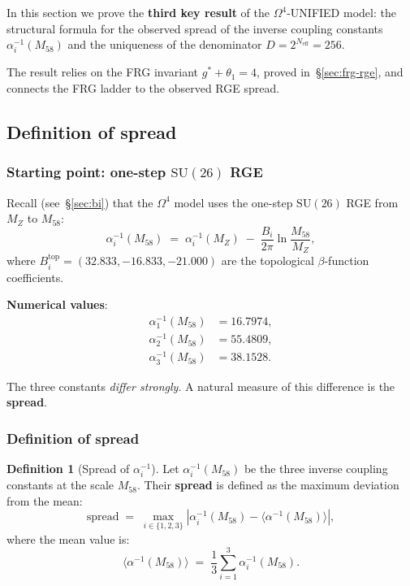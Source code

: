 \documentclass[11pt,a4paper]{article}
\newcommand{\SU}{\ensuremath{\mathrm{SU}}}
\newcommand{\Om}{\ensuremath{\Omega^4}}
\theoremstyle{definition}
\newtheorem{definition}[theorem]{Definition}
\begin{document}
In this section we prove the \textbf{third key result}
of the $\Om$-UNIFIED model: the structural formula for the observed spread
of the inverse coupling constants $\alpha_i^{-1}(M_{58})$ and the uniqueness
of the denominator $D = 2^{N_{\text{eff}}} = 256$.

The result relies on the FRG invariant $g^* + \theta_1 = 4$,
proved in~\S\ref{sec:frg-rge}, and connects the FRG ladder
to the observed RGE spread.

\subsection{Definition of spread}
\label{subsec:spread-def}

\subsubsection{Starting point: one-step \texorpdfstring{$\SU(26)$}{(26)} RGE}

Recall (see~\S\ref{sec:bi}) that the $\Om$ model uses
the one-step $\SU(26)$ RGE from $M_Z$ to $M_{58}$:
\begin{equation}
    \alpha_i^{-1}(M_{58}) \;=\; \alpha_i^{-1}(M_Z)
    \;-\; \frac{B_i}{2\pi} \ln\frac{M_{58}}{M_Z},
    \label{eq:rge-spread-recall}
\end{equation}
where $B_i^{\text{top}} = (32.833, -16.833, -21.000)$ are
the topological $\beta$-function coefficients.

\medskip\noindent
\textbf{Numerical values}:
\begin{align}
    \alpha_1^{-1}(M_{58}) &= 16.7974, \\
    \alpha_2^{-1}(M_{58}) &= 55.4809, \\
    \alpha_3^{-1}(M_{58}) &= 38.1528.
\end{align}

\medskip\noindent
The three constants \emph{differ strongly}. A natural measure
of this difference is the \textbf{spread}.

\subsubsection{Definition of spread}

\begin{definition}[Spread of $\alpha_i^{-1}$]
\label{def:spread}
Let $\alpha_i^{-1}(M_{58})$ be the three inverse coupling constants
at the scale $M_{58}$. Their \textbf{spread} is defined as
the maximum deviation from the mean:
\begin{equation}
    \boxed{
    \text{spread} \;=\; \max_{i \in \{1,2,3\}}
    \left| \alpha_i^{-1}(M_{58})
    - \langle \alpha^{-1}(M_{58}) \rangle \right|,
    }
    \label{eq:spread-def}
\end{equation}
where the mean value is:
\begin{equation}
    \langle \alpha^{-1}(M_{58}) \rangle \;=\;
    \frac{1}{3} \sum_{i=1}^{3} \alpha_i^{-1}(M_{58}).
    \label{eq:spread-mean}
\end{equation}
\end{definition}
\end{document}
